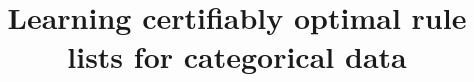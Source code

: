 \documentclass[aoas,preprint]{imsart}
\begin{document}
\begin{frontmatter}

\title{Learning certifiably optimal rule lists for categorical data}


\begin{abstract}

\end{abstract}

\end{frontmatter}

\tableofcontents


\end{document}

